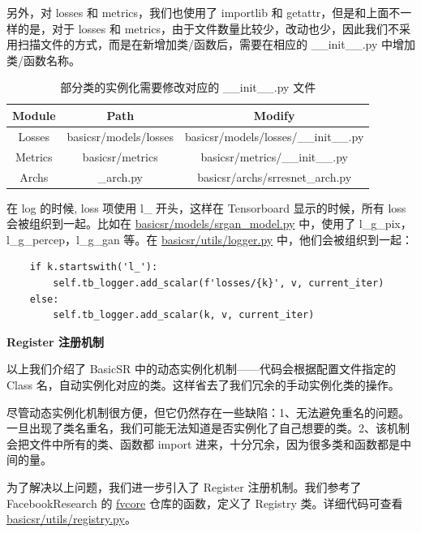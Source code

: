 \documentclass[../main.tex]{subfiles}
\begin{document}
    另外，对 losses 和 metrics，我们也使用了 importlib 和 getattr，但是和上面不一样的是，对于 losses 和 metrics，由于文件数量比较少，改动也少，因此我们不采用扫描文件的方式，而是在新增加类/函数后，需要在相应的 \_\_init\_\_.py 中增加类/函数名称。
    \begin{table}[h]
    \centering
    \begin{tabular}{|c|c|c|}
    \hline
    \textbf{Module} & \textbf{Path} & \textbf{Modify} \\ \hline
    Losses & basicsr/models/losses & basicsr/models/losses/\_\_init\_\_.py \\ \hline
    Metrics & basicsr/metrics & basicsr/metrics/\_\_init\_\_.py \\ \hline
    Archs & \_arch.py & basicsr/archs/srresnet\_arch.py \\ \hline
    \end{tabular}
    \caption{部分类的实例化需要修改对应的 \_\_init\_\_.py 文件}
    \end{table}
    
    在 log 的时候, loss 项使用 l\_ 开头，这样在 Tensorboard 显示的时候，所有 loss 会被组织到一起。比如在 \href{https://github.com/XPixelGroup/BasicSR/blob/master/basicsr/models/srgan_model.py}{basicsr/models/srgan\_model.py} 中，使用了 l\_g\_pix，l\_g\_percep，l\_g\_gan 等。在 \href{https://github.com/XPixelGroup/BasicSR/blob/master/basicsr/utils/logger.py}{basicsr/utils/logger.py} 中，他们会被组织到一起：
    \begin{verbatim}
    if k.startswith('l_'):
        self.tb_logger.add_scalar(f'losses/{k}', v, current_iter)
    else:
        self.tb_logger.add_scalar(k, v, current_iter)
	\end{verbatim}
	
	\textbf{Register 注册机制}
	
	以上我们介绍了 BasicSR 中的动态实例化机制——代码会根据配置文件指定的Class 名，自动实例化对应的类。这样省去了我们冗余的手动实例化类的操作。
	
	尽管动态实例化机制很方便，但它仍然存在一些缺陷：1、无法避免重名的问题。一旦出现了类名重名，我们可能无法知道是否实例化了自己想要的类。2、该机制会把文件中所有的类、函数都 import 进来，十分冗余，因为很多类和函数都是中间的量。
	
	为了解决以上问题，我们进一步引入了 Register 注册机制。我们参考了 FacebookResearch 的 \href{https://github.com/facebookresearch/fvcore}{fvcore} 仓库的函数，定义了 Registry 类。详细代码可查看 \href{https://github.com/XPixelGroup/BasicSR/blob/master/basicsr/utils/registry.py}{basicsr/utils/registry.py}。
	
\end{document}
